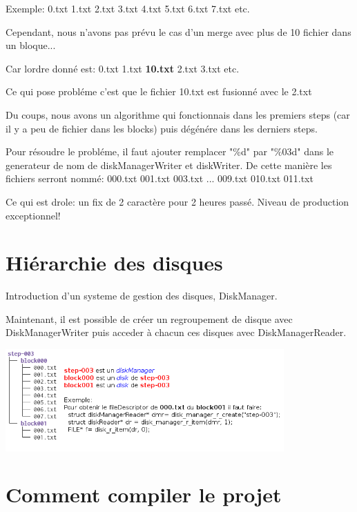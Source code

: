 \documentclass[a4paper]{article}
\begin{document}
Exemple: 0.txt 1.txt  2.txt  3.txt  4.txt  5.txt  6.txt  7.txt etc.

Cependant, nous n'avons pas prévu le cas d'un merge avec plus de 10 fichier dans
un bloque...

Car lordre donné est: 0.txt 1.txt \textbf{10.txt} 2.txt  3.txt etc.

Ce qui pose probléme c'est que le fichier 10.txt est fusionné avec le 2.txt

Du coups, nous avons un algorithme qui fonctionnais dans les premiers steps
(car il y a peu de fichier dans les blocks) puis dégénére dans les derniers
steps.

Pour résoudre le probléme, il faut ajouter remplacer "\%d" par "\%03d" dans le generateur
de nom de diskManagerWriter et diskWriter. De cette manière les fichiers
serront nommé: 000.txt 001.txt 003.txt ... 009.txt 010.txt 011.txt

Ce qui est drole: un fix de 2 caractère pour 2 heures passé.
Niveau de production exceptionnel!


\section{Hiérarchie des disques}

Introduction d'un systeme de gestion des disques, DiskManager.

Maintenant, il est possible de créer un regroupement de disque avec
DiskManagerWriter puis acceder à chacun ces disques avec DiskManagerReader.

\includegraphics[width=0.8\textwidth]{block.png}

\section{Comment compiler le projet}
\end{document}
